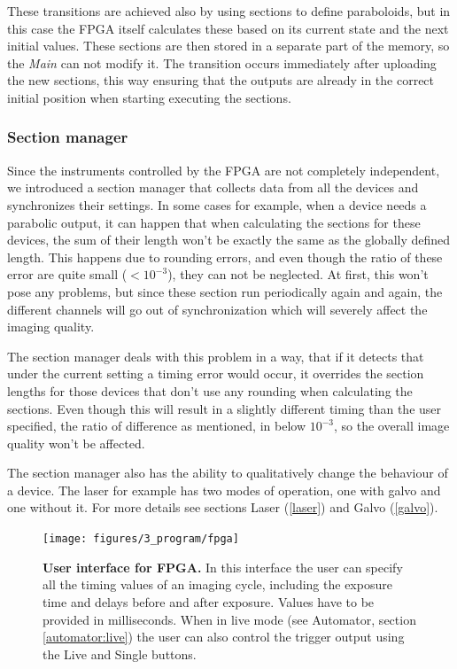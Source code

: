 \documentclass{diploma_style}
\begin{document}
These transitions are achieved also by using sections to define paraboloids, but in this case the FPGA itself calculates these based on its current state and the next initial values. These sections are then stored in a separate part of the memory, so the \emph{Main} can not modify it. The transition occurs immediately after uploading the new sections, this way ensuring that the outputs are already in the correct initial position when starting executing the sections.

\subsubsection{Section manager}
\label{section_manager}
Since the instruments controlled by the FPGA are not completely independent, we introduced a section manager that collects data from all the devices and synchronizes their settings. In some cases for example, when a device needs a parabolic output, it can happen that when calculating the sections for these devices, the sum of their length won't be exactly the same as the globally defined length. This happens due to rounding errors, and even though the ratio of these error are quite small ($<10^{-3}$), they can not be neglected. At first, this won't pose any problems, but since these section run periodically again and again, the different channels will go out of synchronization which will severely affect the imaging quality.

The section manager deals with this problem in a way, that if it detects that under the current setting a timing error would occur, it overrides the section lengths for those devices that don't use any rounding when calculating the sections. Even though this will result in a slightly different timing than the user specified, the ratio of difference as mentioned, in below $10^{-3}$, so the overall image quality won't be affected.

The section manager also has the ability to qualitatively change the behaviour of a device. The laser for example has two modes of operation, one with galvo and one without it. For more details see sections Laser (\ref{laser}) and Galvo (\ref{galvo}).

\begin{figure}[htbp]
	\centering
	\texttt{[image: figures/3\_program/fpga]}
	\caption{\textbf{User interface for FPGA.} In this interface the user can specify all the timing values of an imaging cycle, including the exposure time and delays before and after exposure. Values have to be provided in milliseconds. When in live mode (see Automator, section \ref{automator:live}) the user can also control the trigger output using the Live and Single buttons.}
	\label{fig:ui_fpga}
\end{figure}
\end{document}
